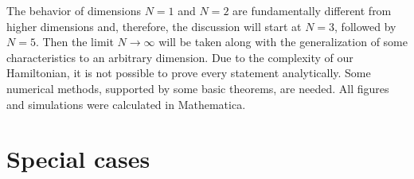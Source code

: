 The behavior of dimensions $N=1$ and $N=2$ are fundamentally different from higher dimensions and, therefore, the discussion will start at $N=3$, followed by $N=5$. Then the limit $N\rightarrow\infty$ will be taken along with the generalization of some characteristics to an arbitrary dimension. Due to the complexity of our Hamiltonian, it is not possible to prove every statement analytically. Some numerical methods, supported by some basic theorems, are needed. All figures and simulations were calculated in Mathematica.











\section{Special cases}
